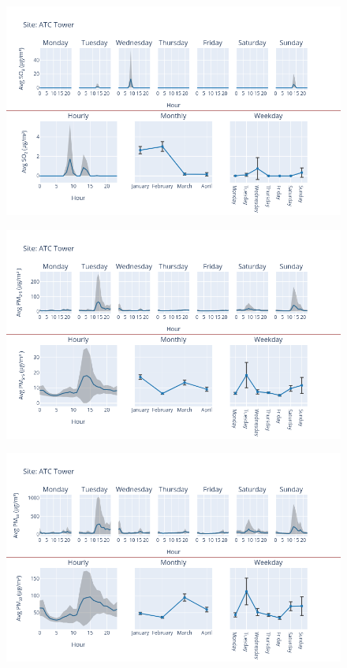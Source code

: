 \documentclass[12pt, oneside]{book}
\begin{document}
{ 
{\begin{figure}[H] 
 \centering 
\includegraphics[width=.88\textwidth, keepaspectratio]{image53} 
 \end{figure}}{} 

{\begin{figure}[H] 
 \centering 
\includegraphics[width=.88\textwidth, keepaspectratio]{image54} 
 \end{figure}}{} 

{\begin{figure}[H] 
 \centering 
\includegraphics[width=.88\textwidth, keepaspectratio]{image55} 
 \end{figure}}{} 

}
\end{document}
